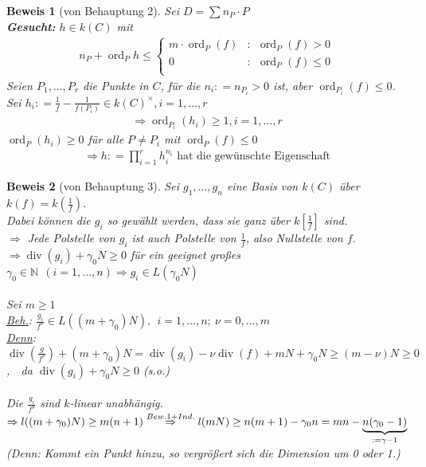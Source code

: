 \documentclass[a4paper,12pt]{report}
\theoremstyle{break}
\theoremstyle{nonumberbreak}
\theoremstyle{nonumberplain}
\newtheorem{Bew}{Beweis}
\newcommand{\defeqr}[0]{\mathrel{\mathop:}=}
\DeclareMathOperator{\ord}{ord}
\begin{document}
\begin{Bew}[von Behauptung 2]
  Sei $D=\sum n_P\cdot P$ \\
  \textbf{Gesucht:} $h\in k(C)$ mit 
  \begin{align*}
    n_P+\ord_Ph\leq\left\{\begin{array}{cc}  
        m\cdot\ord_P(f) &:~~ \ord_P(f)>0 \\
        0 &:~~ \ord_P(f)\leq0 \\
      \end{array}\right.
  \end{align*}
  Seien $P_1,\dots,P_r$ die Punkte in $C$, für die $n_i\defeqr n_{P_i}>0$ ist, aber $\ord_{P_i}(f)\leq 0$.\\ 
  Sei $h_i\defeqr \frac{1}{f}-\frac{1}{f(P_i)}\in k(C)^\times, i=1,\dots,r$
  \begin{align*}
    \Rightarrow\ord_{P_i}(h_i)\geq 1, i=1,\dots,r
  \end{align*}
  $\ord_P(h_i)\geq 0$ für alle $P\neq P_i$ mit $\ord_P(f)\leq 0$
  \begin{align*}
    \Rightarrow h\defeqr\prod_{i=1}^rh_i^{n_i}\text{ hat die gewünschte Eigenschaft}
  \end{align*}
\end{Bew}
\begin{Bew}[von Behauptung 3]
Sei $g_1,...,g_n$ eine Basis von $k(C)$ über $k(f)=k(\frac{1}{f})$.\\
Dabei können die $g_i$ so gewählt werden, dass sie ganz über $k[\frac{1}{f}]$ sind.\\
$\Rightarrow$ Jede Polstelle von $g_i$ ist auch Polstelle von $\frac{1}{f}$, also Nullstelle von $f$.\\
$\Rightarrow \operatorname{div}(g_i) + \gamma_0N \geq 0$ für ein geeignet großes $\gamma_0\in \mathbb{N}~~(i=1,...,n) \Rightarrow g_i\in L(\gamma_0N)$\\\\
Sei $m\geq 1$\\
\underline{Beh.}: $\frac{g_i}{f^\nu}\in L((m+\gamma_0)N),~~ i=1,...,n;~\nu=0,...,m$\\
\underline{Denn}: \\
$\operatorname{div}(\frac{g}{f^\nu})+(m+\gamma_0)N=
\operatorname{div}(g_i)-\nu\operatorname{div}(f)+mN+\gamma_0N
\geq(m-\nu)N\geq0$,~~da $\operatorname{div}(g_i)+\gamma_0N\geq0$ (s.o.)\\
\\
Die $\frac{g_i}{f^\nu}$ sind $k$-linear unabhängig.\\
$\Rightarrow l((m+\gamma_0)N)\geq m(n+1)\\
\stackrel{Bew. 1+ Ind.}{\Rightarrow} l(mN)\geq n(m+1)-\gamma_0n=mn-\underbrace{n(\gamma_0-1)}_{:=\gamma-1}$\\
(Denn: Kommt ein Punkt hinzu, so vergrößert sich die Dimension um 0 oder 1.)
\end{Bew}
\end{document}
